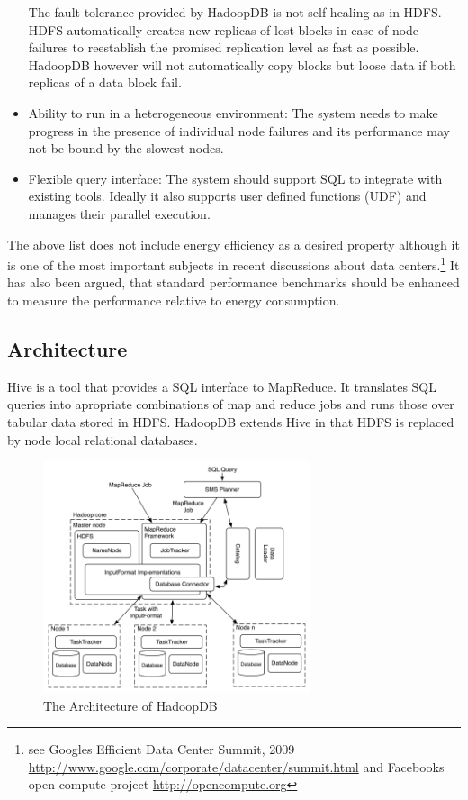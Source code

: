 \documentclass[12pt,a4paper]{scrartcl}		%
\begin{document}
\begin{itemize}
The fault tolerance provided by HadoopDB is not self healing as in HDFS. HDFS automatically creates new replicas of lost blocks in case of node failures to reestablish the promised replication level as fast as possible. HadoopDB however will not automatically copy blocks but loose data if both replicas of a data block fail.

\item Ability to run in a heterogeneous environment: The system needs to make progress in the presence of individual node failures and its performance may not be bound by the slowest nodes.

\item Flexible query interface: The system should support SQL to integrate with existing tools. Ideally it also supports user defined functions (UDF) and manages their parallel execution.

\end{itemize}
The above list does not include energy efficiency as a desired property although it is one of the most important subjects in recent discussions about data centers.\footnote{see Googles Efficient Data Center Summit, 2009 \url{http://www.google.com/corporate/datacenter/summit.html} and Facebooks open compute project \url{http://opencompute.org}} It has also been argued, that standard performance benchmarks should be enhanced to measure the performance relative to energy consumption.\cite{Fanara:2009:SEP:1692899.1692904}

\subsection{Architecture}
Hive is a tool that provides a SQL interface to MapReduce. It translates SQL queries into apropriate combinations of map and reduce jobs and runs those over tabular data stored in HDFS. HadoopDB extends Hive in that HDFS is replaced by node local relational databases.

\begin{figure}[t]
  \centering
  \includegraphics[width=0.7\textwidth]{images/hadoopdb-arch.png}
  \caption{The Architecture of HadoopDB\cite{journals/pvldb/AbouzeidBARS09}}
  \label{fig:hadoopdbarch}
\end{figure}
\end{document}
